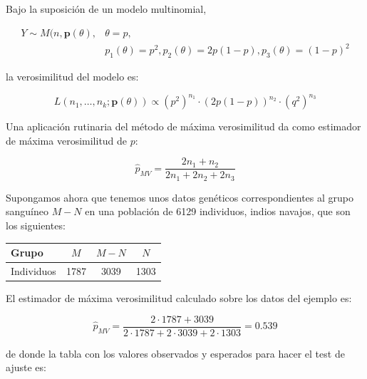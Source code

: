 \documentclass[
]{article}
\begin{document}
Bajo la suposición de un modelo multinomial,

\[
\begin{array}{ll}
Y \sim M(n, \mathbf{p}(\theta), & \theta=p, \\
& p_{1}(\theta)=p^{2}, p_{2}(\theta)=2 p(1-p), p_{3}(\theta)=(1-p)^{2}
\end{array}
\]

la verosimilitud del modelo es:

\[
L\left(n_{1}, \ldots, n_{k} ; \mathbf{p}(\theta)\right) \propto\left(p^{2}\right)^{n_{1}} \cdot(2 p(1-p))^{n_{2}} \cdot\left(q^{2}\right)^{n_{3}}
\]

Una aplicación rutinaria del método de máxima verosimilitud da como estimador de máxima verosimilitud de \(p\):

\[
\hat{p}_{M V}=\frac{2 n_{1}+n_{2}}{2 n_{1}+2 n_{2}+2 n_{3}}
\]

Supongamos ahora que tenemos unos datos genéticos correspondientes al grupo sanguíneo \(M-N\) en una población de 6129 individuos, indios navajos, que son los siguientes:

\begin{longtable}[]{@{}lccc@{}}
\toprule\noalign{}
Grupo & \(M\) & \(M-N\) & \(N\) \\
\midrule\noalign{}
\endhead
\bottomrule\noalign{}
\endlastfoot
Individuos & 1787 & 3039 & 1303 \\
\end{longtable}

El estimador de máxima verosimilitud calculado sobre los datos del ejemplo es:

\[
\hat{p}_{M V}=\frac{2 \cdot 1787+3039}{2 \cdot 1787+2 \cdot 3039+2 \cdot 1303}=0.539
\]

de donde la tabla con los valores observados y esperados para hacer el test de ajuste es:
\end{document}
